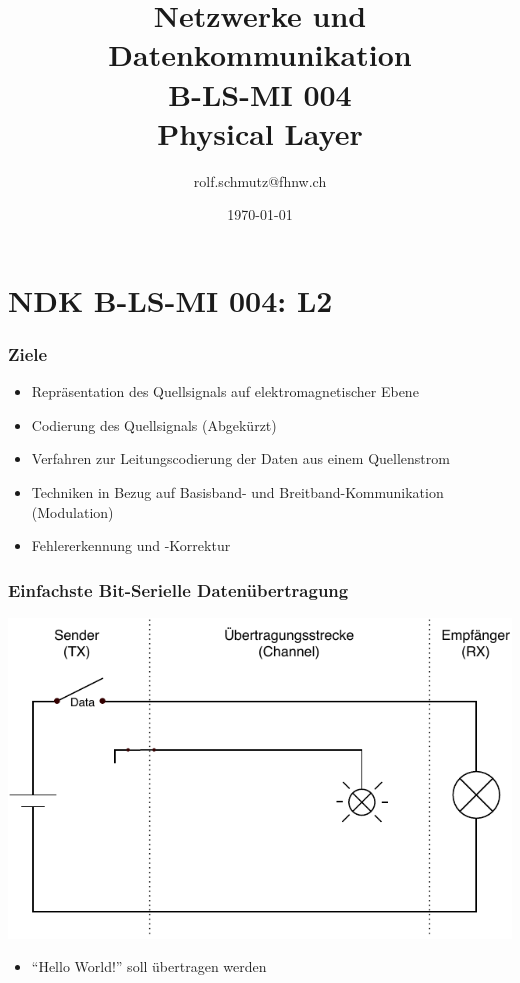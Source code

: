 \documentclass[ignorenonframetext]{beamer}
\date{\today}
\author{rolf.schmutz@fhnw.ch}
\institute{FHNW}
\title {Netzwerke und Datenkommunikation\\B-LS-MI 004\\Physical Layer}
\begin{document}

\section{NDK B-LS-MI 004: L2}



\begin{frame}
\titlepage
\end{frame}

\begin{frame}
\frametitle{Ziele}
\begin{itemize}
	\item{Repr\"asentation des Quellsignals auf elektromagnetischer Ebene}
	\item{Codierung des Quellsignals (Abgek\"urzt)}
	\item{Verfahren zur Leitungscodierung der Daten aus einem Quellenstrom}
	\item{Techniken in Bezug auf Basisband- und Breitband-Kommunikation (Modulation)}
	\item{Fehlererkennung und -Korrektur}
\end{itemize}
\end{frame}





\begin{frame}
\frametitle{Einfachste Bit-Serielle Daten\"ubertragung}
\includegraphics{simplest-serial}

\begin{itemize}
  \item ``Hello World!'' soll \"ubertragen werden
\end{itemize}
\end{frame}
\end{document}
